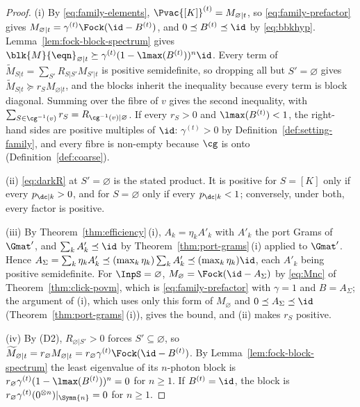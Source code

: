 \begin{proof}
(i) By \eqref{eq:family-elements}, $\Pvac{[K]}^{(t)}=M_{\varnothing|t}$, so
\eqref{eq:family-prefactor} gives
$M_{\varnothing|t}=\gamma^{(t)}\Fock(\id-B^{(t)})$, and
$0\preceq B^{(t)}\preceq\id$ by \eqref{eq:bbkhyp}. Lemma~\ref{lem:fock-block-spectrum}
gives $\blk{M}{\eqn}_{\varnothing|t}\succeq\gamma^{(t)}(1-\lmax(B^{(t)}))^{n}\id$.
Every term of $\widetilde M_{S|t}=\sum_{S'}R_{S|S'}M_{S'|t}$ is positive
semidefinite, so dropping all but $S'=\varnothing$ gives
$\widetilde M_{S|t}\succeq r_SM_{\varnothing|t}$, and the blocks inherit the
inequality because every term is block diagonal. Summing over the fibre of
$v$ gives the second inequality, with
$\sum_{S\in\cg^{-1}(v)}r_S=R_{\cg^{-1}(v)|\varnothing}$. If every $r_S>0$ and
$\lmax(B^{(t)})<1$, the right-hand sides are positive multiples of $\id$:
$\gamma^{(t)}>0$ by Definition~\ref{def:setting-family}, and every fibre is
non-empty because $\cg$ is onto (Definition~\ref{def:coarse}).

(ii) \eqref{eq:darkR} at $S'=\varnothing$ is the stated product. It is positive
for $S=[K]$ only if every $p_{\dc|k}>0$, and for $S=\varnothing$ only if every
$p_{\dc|k}<1$; conversely, under both, every factor is positive.

(iii) By Theorem~\ref{thm:efficiency}\,(i), $A_k=\eta_kA'_k$ with $A'_k$ the
port Grams of $\Gmat'$, and $\sum_kA'_k\preceq\id$ by
Theorem~\ref{thm:port-grams}\,(i) applied to $\Gmat'$. Hence
$A_\Sigma=\sum_k\eta_kA'_k\preceq(\max_k\eta_k)\sum_kA'_k\preceq(\max_k\eta_k)\id$,
each $A'_k$ being positive semidefinite. For $\InpS=\varnothing$,
$M_\varnothing=\Fock(\id-A_\Sigma)$ by \eqref{eq:Mnc} of
Theorem~\ref{thm:click-povm}, which is \eqref{eq:family-prefactor} with
$\gamma=1$ and $B=A_\Sigma$; the argument of (i), which uses only this form of
$M_\varnothing$ and $0\preceq A_\Sigma\preceq\id$
(Theorem~\ref{thm:port-grams}\,(i)), gives the bound, and (ii) makes $r_S$
positive.

(iv) By (D2), $R_{\varnothing|S'}>0$ forces $S'\subseteq\varnothing$, so
$\widetilde M_{\varnothing|t}=r_\varnothing M_{\varnothing|t}
=r_\varnothing\gamma^{(t)}\Fock(\id-B^{(t)})$. By
Lemma~\ref{lem:fock-block-spectrum} the least eigenvalue of its $n$-photon block
is $r_\varnothing\gamma^{(t)}(1-\lmax(B^{(t)}))^{n}=0$ for $n\ge1$. If
$B^{(t)}=\id$, the block is $r_\varnothing\gamma^{(t)}(0^{\otimes n})|_{\Symn{n}}=0$
for $n\ge1$.


\end{proof}
